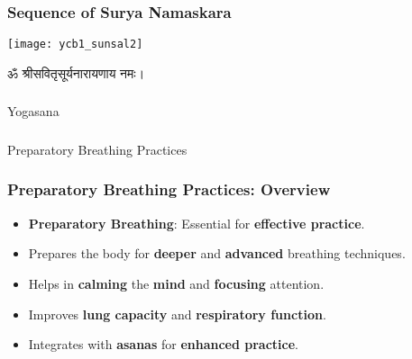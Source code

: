 \begin{frame}[fragile]\frametitle{Sequence of Surya Namaskara}

        \begin{center}
        \texttt{[image: ycb1\_sunsal2]}
		
		ॐ श्रीसवितृसूर्यनारायणाय नमः।

        \end{center}	

\end{frame}

\begin{frame}[fragile]\frametitle{}
\begin{center}
{\Large Yogasana}
\end{center}
\end{frame}




\begin{frame}[fragile]\frametitle{}
\begin{center}
{\Large Preparatory Breathing Practices }
\end{center}
\end{frame}

\begin{frame}[fragile]\frametitle{Preparatory Breathing Practices: Overview}
      \begin{itemize}
        \item \textbf{Preparatory Breathing}: Essential for \textbf{effective practice}.
        \item Prepares the body for \textbf{deeper} and \textbf{advanced} breathing techniques.
        \item Helps in \textbf{calming} the \textbf{mind} and \textbf{focusing} attention.
        \item Improves \textbf{lung capacity} and \textbf{respiratory function}.
        \item Integrates with \textbf{asanas} for \textbf{enhanced practice}.
      \end{itemize}

\end{frame}

